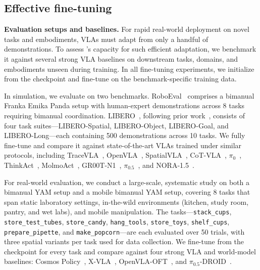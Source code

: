\subsection{Effective fine-tuning}
\label{sec:exp-ft}

\textbf{Evaluation setups and baselines.} For rapid real-world deployment on novel tasks and embodiments, VLAs must adapt from only a handful of demonstrations. To assess \molmoact's capacity for such efficient adaptation, we benchmark it against several strong VLA baselines on downstream tasks, domains, and embodiments unseen during training. In all fine-tuning experiments, we initialize from the \molmoacttpos checkpoint and fine-tune on the benchmark-specific training data.

In simulation, we evaluate on two benchmarks. RoboEval~\citep{wang2025roboeval} comprises a bimanual Franka Emika Panda setup with human-expert demonstrations across 8 tasks requiring bimanual coordination. LIBERO~\citep{liu2023libero}, following prior work~\citep{kim2024openvla}, consists of four task suites—LIBERO-Spatial, LIBERO-Object, LIBERO-Goal, and LIBERO-Long—each containing 500 demonstrations across 10 tasks. We fully fine-tune \molmoactt and compare it against state-of-the-art VLAs trained under similar protocols, including TraceVLA~\citep{zheng2024tracevla}, OpenVLA~\citep{kim2024openvla}, SpatialVLA~\citep{qu2025spatialvla}, CoT-VLA~\citep{zhao2025cot}, $\pi_{0}$~\citep{black2410pi0}, ThinkAct~\citep{huang2025thinkact}, MolmoAct~\citep{lee2025molmoactactionreasoningmodels}, GR00T-N1~\citep{gr00tn1_2025}, $\pi_{0.5}$~\citep{intelligence2025pi05visionlanguageactionmodelopenworld}, and NORA-1.5~\citep{hung2025nora}.

For real-world evaluation, we conduct a large-scale, systematic study on both a bimanual YAM setup and a mobile bimanual YAM setup, covering 8 tasks that span static laboratory settings, in-the-wild environments (kitchen, study room, pantry, and wet labs), and mobile manipulation. The tasks—\texttt{stack\_cups}, \texttt{store\_test\_tubes}, \texttt{store\_candy}, \texttt{hang\_tools}, \texttt{store\_toys}, \texttt{shelf\_cups}, \texttt{prepare\_pipette}, and \texttt{make\_popcorn}—are each evaluated over 50 trials, with three spatial variants per task used for data collection. We fine-tune from the \molmoacttpos checkpoint for every task and compare against four strong VLA and world-model baselines: Cosmos Policy~\citep{kim2026cosmos}, X-VLA~\citep{zheng2025x}, OpenVLA-OFT~\citep{kim2025fine}, and $\pi_{0.5}$-DROID~\citep{intelligence2025pi05visionlanguageactionmodelopenworld}.

